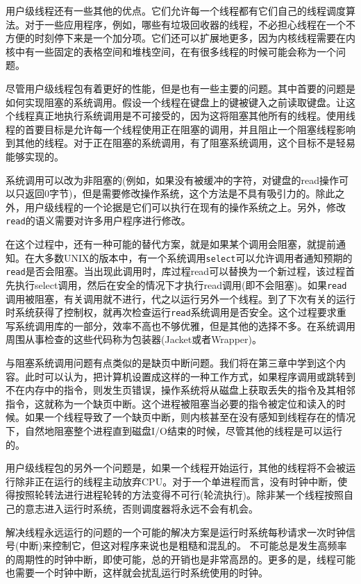 	用户级线程还有一些其他的优点。它们允许每一个线程都有它们自己的线程调度算法。对于一些应用程序，例如，哪些有垃圾回收器的线程，不必担心线程在一个不方便的时刻停下来是一个加分项。它们还可以扩展地更多，因为内核线程需要在内核中有一些固定的表格空间和堆栈空间，在有很多线程的时候可能会称为一个问题。
	
	尽管用户级线程包有着更好的性能，但是也有一些主要的问题。其中首要的问题是如何实现阻塞的系统调用。假设一个线程在键盘上的键被键入之前读取键盘。让这个线程真正地执行系统调用是不可接受的，因为这将阻塞其他所有的线程。使用线程的首要目标是允许每一个线程使用正在阻塞的调用，并且阻止一个阻塞线程影响到其他的线程。对于正在阻塞的系统调用，有了阻塞系统调用，这个目标不是轻易能够实现的。
	
	系统调用可以改为非阻塞的(例如，如果没有被缓冲的字符，对键盘的read操作可以只返回0字节)，但是需要修改操作系统，这个方法是不具有吸引力的。除此之外，用户级线程的一个论据是它们可以执行在现有的操作系统之上。另外，修改\texttt{read}的语义需要对许多用户程序进行修改。
	
	在这个过程中，还有一种可能的替代方案，就是如果某个调用会阻塞，就提前通知。在大多数UNIX的版本中，有一个系统调用\texttt{select}可以允许调用者通知预期的\texttt{read}是否会阻塞。当出现此调用时，库过程read可以替换为一个新过程，该过程首先执行select调用，然后在安全的情况下才执行read调用(即不会阻塞)。如果\texttt{read}调用被阻塞，有关调用就不进行，代之以运行另外一个线程。到了下次有关的运行时系统获得了控制权，就再次检查运行\texttt{read}系统调用是否安全。这个过程要求重写系统调用库的一部分，效率不高也不够优雅，但是其他的选择不多。在系统调用周围从事检查的这些代码称为包装器(Jacket或者Wrapper)。
	
	与阻塞系统调用问题有点类似的是缺页中断问题。我们将在第三章中学到这个内容。此时可以认为，把计算机设置成这样的一种工作方式，如果程序调用或跳转到不在内存中的指令，则发生页错误，操作系统将从磁盘上获取丢失的指令及其相邻指令，这就称为一个缺页中断。这个进程被阻塞当必要的指令被定位和读入的时候。如果一个线程导致了一个缺页中断，则内核甚至在没有感知到线程存在的情况下，自然地阻塞整个进程直到磁盘I/O结束的时候，尽管其他的线程是可以运行的。
	
	用户级线程包的另外一个问题是，如果一个线程开始运行，其他的线程将不会被运行除非正在运行的线程主动放弃CPU。对于一个单进程而言，没有时钟中断，使得按照轮转法进行进程轮转的方法变得不可行(轮流执行)。除非某一个线程按照自己的意志进入运行时系统，否则调度器将永远不会有机会。
	
	解决线程永远运行的问题的一个可能的解决方案是运行时系统每秒请求一次时钟信号(中断)来控制它，但这对程序来说也是粗糙和混乱的。
	不可能总是发生高频率的周期性的时钟中断，即使可能，总的开销也是非常高昂的。更多的是，线程可能也需要一个时钟中断，这样就会扰乱运行时系统使用的时钟。
	
